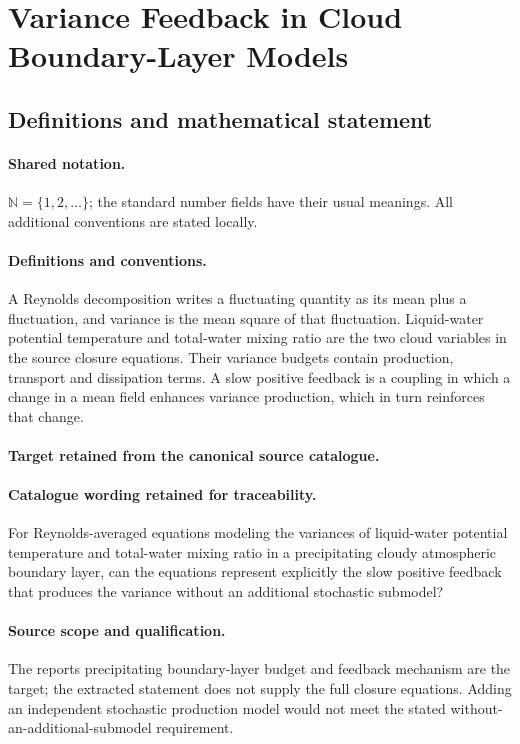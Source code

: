 \documentclass[11pt]{article}
\begin{document}
\section{Variance Feedback in Cloud Boundary-Layer Models}\label{statement}

\subsection{Definitions and mathematical statement}

\paragraph{Shared notation.}$\mathbb N=\{1,2,\ldots\}$; the standard number fields have their usual meanings. All additional conventions are stated locally.


\paragraph{Definitions and conventions.}
A Reynolds decomposition writes a fluctuating quantity as its mean plus a fluctuation, and variance is the mean square of that fluctuation. Liquid-water potential temperature and total-water mixing ratio are the two cloud variables in the source closure equations. Their variance budgets contain production, transport and dissipation terms. A slow positive feedback is a coupling in which a change in a mean field enhances variance production, which in turn reinforces that change.

\paragraph{Target retained from the canonical source catalogue.}
\paragraph{Catalogue wording retained for traceability.}
For Reynolds-averaged equations modeling the variances of liquid-water potential temperature and total-water mixing ratio in a precipitating cloudy atmospheric boundary layer, can the equations represent explicitly the slow positive feedback that produces the variance without an additional stochastic submodel?

\paragraph{Source scope and qualification.}
The report\textquotesingle s precipitating boundary-layer budget and feedback mechanism are the target; the extracted statement does not supply the full closure equations. Adding an independent stochastic production model would not meet the stated without-an-additional-submodel requirement.
\end{document}
